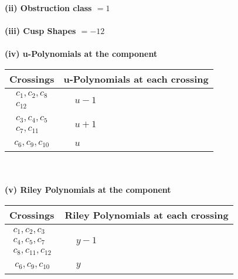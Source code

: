 \documentclass[1p]{elsarticle_modified}
\theoremstyle{definition}
\begin{document}
\flushleft \textbf{(ii) Obstruction class $= 1$}\\~\\
\flushleft \textbf{(iii) Cusp Shapes $= -12$}\\~\\
\newpage\renewcommand{\arraystretch}{1}
\flushleft \textbf{(iv) u-Polynomials at the component}\newline \\
\begin{tabular}{m{50pt}|m{274pt}}
Crossings & \hspace{64pt}u-Polynomials at each crossing \\
\hline $$\begin{aligned}c_{1},c_{2},c_{8}\\c_{12}\end{aligned}$$&$\begin{aligned}
&u-1
\end{aligned}$\\
\hline $$\begin{aligned}c_{3},c_{4},c_{5}\\c_{7},c_{11}\end{aligned}$$&$\begin{aligned}
&u+1
\end{aligned}$\\
\hline $$\begin{aligned}c_{6},c_{9},c_{10}\end{aligned}$$&$\begin{aligned}
&u
\end{aligned}$\\
\hline
\end{tabular}\\~\\
\newpage\renewcommand{\arraystretch}{1}
\flushleft \textbf{(v) Riley Polynomials at the component}\newline \\
\begin{tabular}{m{50pt}|m{274pt}}
Crossings & \hspace{64pt}Riley Polynomials at each crossing \\
\hline $$\begin{aligned}c_{1},c_{2},c_{3}\\c_{4},c_{5},c_{7}\\c_{8},c_{11},c_{12}\end{aligned}$$&$\begin{aligned}
&y-1
\end{aligned}$\\
\hline $$\begin{aligned}c_{6},c_{9},c_{10}\end{aligned}$$&$\begin{aligned}
&y
\end{aligned}$\\
\hline
\end{tabular}\\~\\
\end{document}
